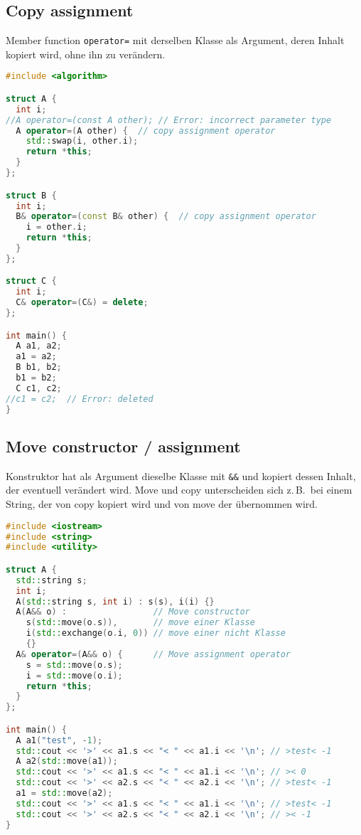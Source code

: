 \subsection{Copy assignment}

Member function \lstinline|operator=| mit derselben Klasse als Argument, deren
Inhalt kopiert wird, ohne ihn zu verändern.

\begin{lstlisting}[language=C++]
#include <algorithm>

struct A {
  int i;
//A operator=(const A other); // Error: incorrect parameter type
  A operator=(A other) {  // copy assignment operator
    std::swap(i, other.i);
    return *this;
  }
};

struct B {
  int i;
  B& operator=(const B& other) {  // copy assignment operator
    i = other.i;
    return *this;
  }
};

struct C {
  int i;
  C& operator=(C&) = delete;
};

int main() {
  A a1, a2;
  a1 = a2;
  B b1, b2;
  b1 = b2;
  C c1, c2;
//c1 = c2;  // Error: deleted
}
\end{lstlisting}

\subsection{Move constructor / assignment}

Konstruktor hat als Argument dieselbe Klasse mit \lstinline|&&| und kopiert
dessen Inhalt, der eventuell verändert wird. Move und copy unterscheiden sich
z.\,B.\ bei einem String, der von copy kopiert wird und von move der übernommen
wird.

\begin{lstlisting}[language=C++]
#include <iostream>
#include <string>
#include <utility>

struct A {
  std::string s;
  int i;
  A(std::string s, int i) : s(s), i(i) {}
  A(A&& o) :                 // Move constructor
    s(std::move(o.s)),       // move einer Klasse
    i(std::exchange(o.i, 0)) // move einer nicht Klasse
    {}
  A& operator=(A&& o) {      // Move assignment operator
    s = std::move(o.s);
    i = std::move(o.i);
    return *this;
  }
};

int main() {
  A a1("test", -1);
  std::cout << '>' << a1.s << "< " << a1.i << '\n'; // >test< -1
  A a2(std::move(a1));
  std::cout << '>' << a1.s << "< " << a1.i << '\n'; // >< 0
  std::cout << '>' << a2.s << "< " << a2.i << '\n'; // >test< -1
  a1 = std::move(a2);
  std::cout << '>' << a1.s << "< " << a1.i << '\n'; // >test< -1
  std::cout << '>' << a2.s << "< " << a2.i << '\n'; // >< -1
}
\end{lstlisting}

